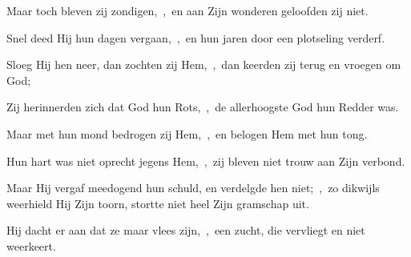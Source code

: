 \documentclass[12pt,twoside,a5paper]{article}
\begin{document}
\begin{halfparskip}
  Maar toch bleven zij zondigen,~\sep\ en aan Zijn wonderen geloofden zij niet.

  Snel deed Hij hun dagen vergaan,~\sep\ en hun jaren door een plotseling verderf.

  Sloeg Hij hen neer, dan zochten zij Hem,~\sep\ dan keerden zij terug en vroegen om God;

  Zij herinnerden zich dat God hun Rots,~\sep\ de allerhoogste God hun Redder was.

  Maar met hun mond bedrogen zij Hem,~\sep\ en belogen Hem met hun tong.

  Hun hart was niet oprecht jegens Hem,~\sep\ zij bleven niet trouw aan Zijn verbond.

  Maar Hij vergaf meedogend hun schuld, en verdelgde hen niet;~\sep\ zo dikwijls weerhield Hij Zijn toorn, stortte niet heel Zijn gramschap uit.

  Hij dacht er aan dat ze maar vlees zijn,~\sep\ een zucht, die vervliegt en niet weerkeert.
\end{halfparskip}

\end{document}
